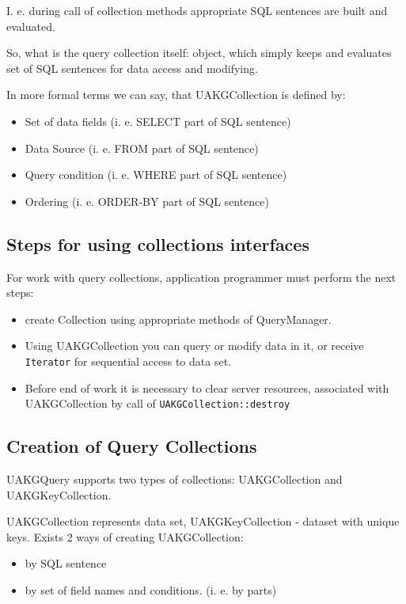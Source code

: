 I. e. during call of collection methods appropriate SQL sentences are
built and evaluated.

 So, what is the query collection itself: object, which simply
 keeps and evaluates set of SQL sentences for data access and
 modifying.


In more formal terms we can say, that
 UAKGCollection is defined by:
 \begin{itemize}
   \item Set of data fields (i. e. SELECT part of SQL sentence)
   \item Data Source (i. e. FROM part of SQL sentence)
   \item Query condition (i. e. WHERE part of SQL sentence)
   \item Ordering (i. e. ORDER-BY part of SQL sentence)
 \end{itemize}


\subsection{ Steps for using collections interfaces  }

 For work with query collections, application programmer must
perform the next steps:

 \begin{itemize}
   \item create Collection using appropriate methods of QueryManager.
  \item Using UAKGCollection you can query or modify data in it, or
    receive \verb|Iterator| for sequential access to data set.
  \item Before end of work it is necessary to clear server resources,
   associated with  UAKGCollection by call of \verb|UAKGCollection::destroy| 
 \end{itemize}

\subsection{ Creation of Query Collections }

 UAKGQuery supports two types of collections: 
 UAKGCollection and UAKGKeyCollection.

 UAKGCollection represents data set, UAKGKeyCollection - dataset with unique
keys.
 \newline
 \newline
 Exists 2 ways of creating UAKGCollection:
\begin{itemize}
   \item by SQL sentence
   \item by set of field names and conditions. (i. e. by parts)
 \end{itemize}

